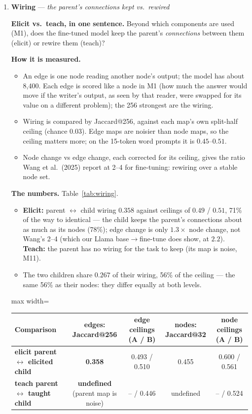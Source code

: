 \documentclass[11pt]{article}
\newcommand{\what}[1]{\par\noindent\textbf{Elicit vs.\ teach, in one sentence.} #1}
\newcommand{\how}[1]{\par\noindent\textbf{How it is measured.} #1}
\newcommand{\numbers}[1]{\par\noindent\textbf{The numbers.} #1\par\medskip}
\newenvironment{steps}{\begin{itemize}[nosep,leftmargin=1.2em,topsep=2pt]}{\end{itemize}}
\newcommand{\metricsec}[2]{\item \textbf{#1} --- \emph{#2}}
\begin{document}
\begin{enumerate}[label=\textbf{M\arabic*}, leftmargin=*, itemsep=1.2em, resume]
\metricsec{Wiring}{the parent's connections kept vs.\ rewired}
\what{Beyond which components are used (M1), does the fine-tuned model keep the parent's
\emph{connections} between them (elicit) or rewire them (teach)?}
\how{
\begin{steps}
\item An edge is one node reading another node's output; the model has about 8,400. Each edge
is scored like a node in M1 (how much the answer would move if the writer's output, as seen by
that reader, were swapped for its value on a different problem); the 256 strongest are the
wiring.
\item Wiring is compared by Jaccard@256, against each map's own split-half ceiling (chance
$0.03$). Edge maps are noisier than node maps, so the ceiling matters more; on the 15-token
word prompts it is $0.45$--$0.51$.
\item Node change vs edge change, each corrected for its ceiling, gives the ratio Wang et al.\
(2025) report at 2--4 for fine-tuning: rewiring over a stable node set.
\end{steps}}
\numbers{Table~\ref{tab:wiring}.
\begin{steps}
\item \textbf{Elicit:} parent $\leftrightarrow$ child wiring $0.358$ against ceilings of
$0.49$ / $0.51$, 71\% of the way to identical --- the child keeps the parent's connections
about as much as its nodes (78\%); edge change is only $1.3\times$ node change, not Wang's
2--4 (which our Llama base$\to$fine-tune does show, at $2.2$). \textbf{Teach:} the parent has
no wiring for the task to keep (its map is noise, M11).
\item The two children share $0.267$ of their wiring, 56\% of the ceiling --- the same 56\% as
their nodes: they differ equally at both levels.
\end{steps}}
\begin{table}[h]\centering\small
\begin{adjustbox}{max width=\textwidth}
\begin{tabular}{lcccc}
\toprule
Comparison & edges: Jaccard@256 & edge ceilings (A / B) & nodes: Jaccard@32 & node ceilings (A / B) \\
\midrule
\textbf{elicit parent $\leftrightarrow$ elicited child} & \textbf{0.358} & 0.493 / 0.510 & 0.455 & 0.600 / 0.561 \\
\textbf{teach parent $\leftrightarrow$ taught child} & \textbf{undefined} (parent map is noise) & -- / 0.446 & undefined & -- / 0.524 \\

\end{tabular}
\end{adjustbox}
\end{table}
\end{enumerate}
\end{document}
